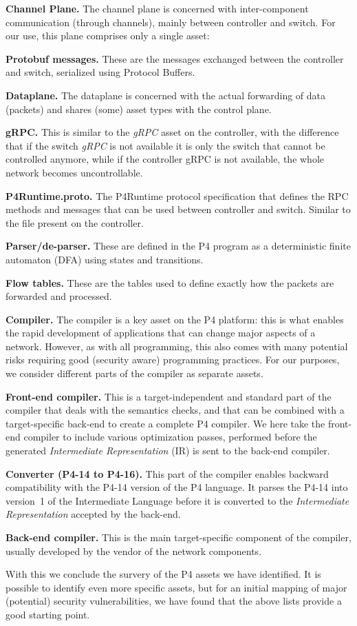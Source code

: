 \documentclass[10pt,sigconf]{acmart}
\newenvironment{mydesc}{\par}{\par}
\newcommand{\myitem}[1][*]{\par\textbf{#1}}
\begin{document}
\noindent\textbf{Channel Plane.}
The channel plane is concerned with inter-component communication
(through channels), mainly between controller and switch. For our use,
this plane comprises only a single asset:
\begin{mydesc}
\myitem[Protobuf messages.] These are the messages exchanged between the
  controller and switch, serialized using Protocol Buffers.
\end{mydesc}

\noindent\textbf{Dataplane.}
The dataplane is concerned with the actual forwarding of data
(packets) and shares (some) asset types with the control plane.
\begin{mydesc}
\myitem[gRPC.] This is similar to the \emph{gRPC} asset on the
  controller, with the difference that if the switch \emph{gRPC} is
  not available it is only the switch that cannot be controlled
  anymore, while if the controller gRPC is not available, the whole
  network becomes uncontrollable.
\myitem[P4Runtime.proto.] The P4Runtime protocol specification that
  defines the RPC methods and messages that can be used between
  controller and switch. Similar to the file present on the
  controller.
\myitem[Parser/de-parser.] These are defined in the P4 program as a
  deterministic finite automaton (DFA) using states and transitions.
\myitem[Flow tables.] These are the tables used to define exactly how
  the packets are forwarded and processed.
\end{mydesc}

\noindent\textbf{Compiler.}
The compiler is a key asset on the P4 platform: this is what enables
the rapid development of applications that can change major aspects of
a network. However, as with all programming, this also comes with many
potential risks requiring good (security aware) programming practices.
For our purposes, we consider different parts of the compiler as
separate assets.
\begin{mydesc}
\myitem[Front-end compiler.] This is a target-independent and standard
  part of the compiler that deals with the semantics checks, and that
  can be combined with a target-specific back-end to create a complete
  P4 compiler. We here take the front-end compiler to include various
  optimization passes, performed before the generated
  \emph{Intermediate Representation} (IR) is sent to the back-end
  compiler.
\myitem[Converter (P4-14 to P4-16).] This part of the compiler enables
  backward compatibility with the P4-14 version of the P4 language. It
  parses the P4-14 into version~1 of the Intermediate Language before
  it is converted to the \emph{Intermediate Representation} accepted
  by the back-end.
\myitem[Back-end compiler.] This is the main target-specific component
  of the compiler, usually developed by the vendor of the network
  components.
\end{mydesc}
With this we conclude the survery of the P4 assets we have identified.
It is possible to identify even more specific assets, but for an
initial mapping of major (potential) security vulnerabilities, we have
found that the above lists provide a good starting point.
\end{document}
